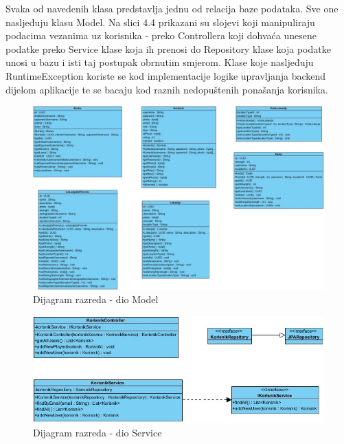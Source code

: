 			Svaka od navedenih klasa predstavlja jednu od relacija baze podataka. Sve one nasljeđuju klasu Model. Na slici 4.4 prikazani su slojevi koji manipuliraju podacima vezanima uz korisnika - preko Controllera koji dohvaća unesene podatke preko Service klase koja ih prenosi do Repository klase koja podatke unosi u bazu i isti taj postupak obrnutim smjerom. Klase koje nasljeđuju RuntimeException koriste se kod implementacije logike upravljanja backend dijelom aplikacije te se bacaju kod raznih nedopuštenih ponašanja korisnika.
	
				\begin{figure}[H]
					\includegraphics[width=\textwidth]{slike/model.jpg} %
					\centering
					\caption{Dijagram razreda - dio Model}
					\label{fig:promjene}
				\end{figure}
			\eject

				\begin{figure}[H]
					\includegraphics[width=\textwidth]{slike/service.jpg} %
					\centering
					\caption{Dijagram razreda - dio Service}
					\label{fig:promjene}
				\end{figure}

